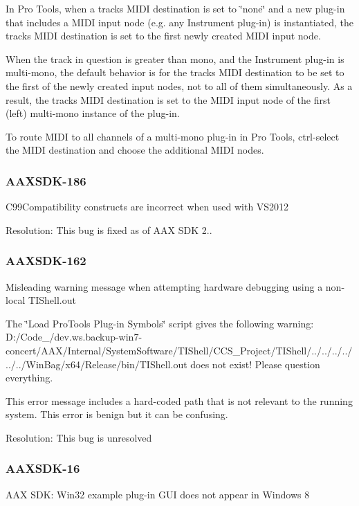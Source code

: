 In Pro Tools, when a track\textquotesingle{}s M\+I\+DI destination is set to \char`\"{}none\char`\"{} and a new plug-\/in that includes a M\+I\+DI input node (e.\+g. any Instrument plug-\/in) is instantiated, the track\textquotesingle{}s M\+I\+DI destination is set to the first newly created M\+I\+DI input node.

When the track in question is greater than mono, and the Instrument plug-\/in is multi-\/mono, the default behavior is for the track\textquotesingle{}s M\+I\+DI destination to be set to the first of the newly created input nodes, not to all of them simultaneously. As a result, the track\textquotesingle{}s M\+I\+DI destination is set to the M\+I\+DI input node of the first (left) multi-\/mono instance of the plug-\/in.

To route M\+I\+DI to all channels of a multi-\/mono plug-\/in in Pro Tools, ctrl-\/select the M\+I\+DI destination and choose the additional M\+I\+DI nodes.\hypertarget{a00846_AAXSDK-186}{}\subsubsection{A\+A\+X\+S\+D\+K-\/186}\label{a00846_AAXSDK-186}
C99\+Compatibility constructs are incorrect when used with V\+S2012

Resolution\+: This bug is fixed as of A\+AX S\+DK 2..\hypertarget{a00846_AAXSDK-162}{}\subsubsection{A\+A\+X\+S\+D\+K-\/162}\label{a00846_AAXSDK-162}
Misleading warning message when attempting hardware debugging using a non-\/local T\+I\+Shell.\+out

The \char`\"{}\+Load Pro\+Tools Plug-\/in Symbols\char`\"{} script gives the following warning\+: {\ttfamily D\+:/\+Code\+\_/dev.ws.\+backup-\/win7-\/concert/\+A\+A\+X/\+Internal/\+System\+Software/\+T\+I\+Shell/\+C\+C\+S\+\_\+\+Project/\+T\+I\+Shell/../../../../../../\+Win\+Bag/x64/\+Release/bin/\+T\+I\+Shell.out does not exist! Please question everything.}

This error message includes a hard-\/coded path that is not relevant to the running system. This error is benign but it can be confusing.

Resolution\+: This bug is unresolved\hypertarget{a00846_AAXSDK-16}{}\subsubsection{A\+A\+X\+S\+D\+K-\/16}\label{a00846_AAXSDK-16}
A\+AX S\+DK\+: Win32 example plug-\/in G\+UI does not appear in Windows 8

